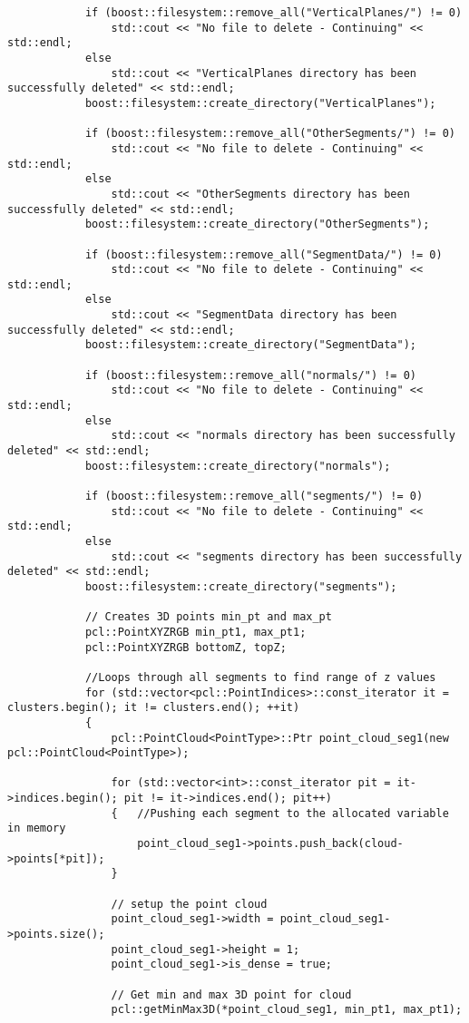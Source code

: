 \begin{lstlisting}
			if (boost::filesystem::remove_all("VerticalPlanes/") != 0)
				std::cout << "No file to delete - Continuing" << std::endl;
			else
				std::cout << "VerticalPlanes directory has been successfully deleted" << std::endl;
			boost::filesystem::create_directory("VerticalPlanes");

			if (boost::filesystem::remove_all("OtherSegments/") != 0)
				std::cout << "No file to delete - Continuing" << std::endl;
			else
				std::cout << "OtherSegments directory has been successfully deleted" << std::endl;
			boost::filesystem::create_directory("OtherSegments");

			if (boost::filesystem::remove_all("SegmentData/") != 0)
				std::cout << "No file to delete - Continuing" << std::endl;
			else
				std::cout << "SegmentData directory has been successfully deleted" << std::endl;
			boost::filesystem::create_directory("SegmentData");

			if (boost::filesystem::remove_all("normals/") != 0)
				std::cout << "No file to delete - Continuing" << std::endl;
			else
				std::cout << "normals directory has been successfully deleted" << std::endl;
			boost::filesystem::create_directory("normals");

			if (boost::filesystem::remove_all("segments/") != 0)
				std::cout << "No file to delete - Continuing" << std::endl;
			else
				std::cout << "segments directory has been successfully deleted" << std::endl;
			boost::filesystem::create_directory("segments");

			// Creates 3D points min_pt and max_pt
			pcl::PointXYZRGB min_pt1, max_pt1;
			pcl::PointXYZRGB bottomZ, topZ;

			//Loops through all segments to find range of z values
			for (std::vector<pcl::PointIndices>::const_iterator it = clusters.begin(); it != clusters.end(); ++it)
			{
				pcl::PointCloud<PointType>::Ptr point_cloud_seg1(new pcl::PointCloud<PointType>);

				for (std::vector<int>::const_iterator pit = it->indices.begin(); pit != it->indices.end(); pit++)
				{	//Pushing each segment to the allocated variable in memory
					point_cloud_seg1->points.push_back(cloud->points[*pit]);
				}

				// setup the point cloud
				point_cloud_seg1->width = point_cloud_seg1->points.size();
				point_cloud_seg1->height = 1;
				point_cloud_seg1->is_dense = true;

				// Get min and max 3D point for cloud
				pcl::getMinMax3D(*point_cloud_seg1, min_pt1, max_pt1);


\end{lstlisting}
